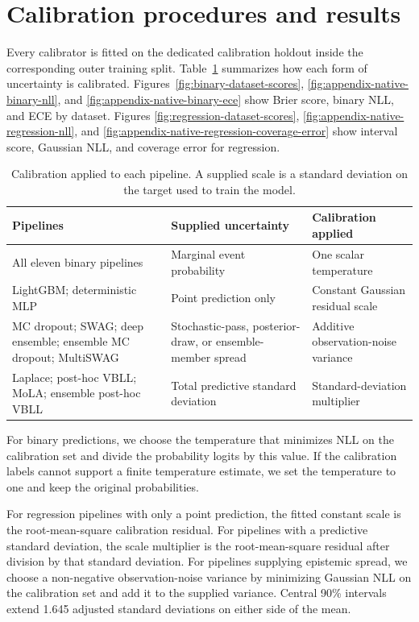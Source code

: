 \section{Calibration procedures and results}
\label{app:calibration-details}

Every calibrator is fitted on the dedicated calibration holdout inside the corresponding outer
training split. Table~\ref{tab:calibration-map} summarizes how each form of uncertainty is
calibrated. Figures~\ref{fig:binary-dataset-scores}, \ref{fig:appendix-native-binary-nll}, and
\ref{fig:appendix-native-binary-ece} show Brier score, binary NLL, and ECE by dataset. Figures
\ref{fig:regression-dataset-scores}, \ref{fig:appendix-native-regression-nll}, and
\ref{fig:appendix-native-regression-coverage-error} show interval score, Gaussian NLL, and coverage
error for regression.

\begin{table}[!htbp]
\centering
\caption{Calibration applied to each pipeline. A supplied scale is a standard deviation on the
target used to train the model.}
\label{tab:calibration-map}
\footnotesize
\begin{tabularx}{\textwidth}{@{}>{\raggedright\arraybackslash}p{}
  >{\raggedright\arraybackslash}p{}>{\raggedright\arraybackslash}X@{}}
\toprule
Pipelines & Supplied uncertainty & Calibration applied \\
\midrule
All eleven binary pipelines & Marginal event probability & One scalar temperature \\
LightGBM; deterministic MLP & Point prediction only & Constant Gaussian residual scale \\
MC dropout; SWAG; deep ensemble; ensemble MC dropout; MultiSWAG
  & Stochastic-pass, posterior-draw, or ensemble-member spread
  & Additive observation-noise variance \\
Laplace; post-hoc VBLL; MoLA; ensemble post-hoc VBLL
  & Total predictive standard deviation & Standard-deviation multiplier \\
\bottomrule
\end{tabularx}
\end{table}

For binary predictions, we choose the temperature that minimizes NLL on the calibration set and
divide the probability logits by this value. If the calibration labels cannot support a finite
temperature estimate, we set the temperature to one and keep the original probabilities.

For regression pipelines with only a point prediction, the fitted constant scale is the
root-mean-square calibration residual. For pipelines with a predictive standard deviation, the
scale multiplier is the root-mean-square residual after division by that standard deviation. For
pipelines supplying epistemic spread, we choose a non-negative observation-noise variance by
minimizing Gaussian NLL on the calibration set and add it to the supplied variance. Central 90\%
intervals extend 1.645 adjusted standard deviations on either side of the mean.

